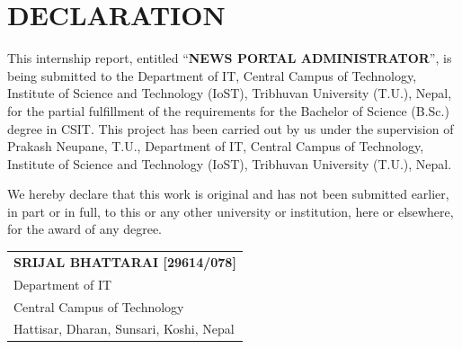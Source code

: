 \section*{\centering \Large \textbf{DECLARATION}}

\sloppy

This internship report, entitled ``{\bf NEWS PORTAL ADMINISTRATOR}'', is being submitted to the Department of IT, Central Campus of Technology, Institute of Science and Technology (IoST), Tribhuvan
University (T.U.), Nepal, for the partial fulfillment of the requirements for the Bachelor of Science (B.Sc.) degree in CSIT. This project has been carried out by us under the supervision of Prakash Neupane, T.U., Department of IT, Central Campus of Technology, Institute of Science and Technology (IoST), Tribhuvan University (T.U.), Nepal.

We hereby declare that this work is original and has not been submitted earlier, in part or in full, to this or any other university or institution, here or elsewhere, for the award of any degree.


\begin{flushleft}
\begin{tabular}{@{}l@{}}
    \textbf{SRIJAL BHATTARAI [29614/078]} \\
    Department of IT \\
    Central Campus of Technology \\
    Hattisar, Dharan, Sunsari, Koshi, Nepal \\
\end{tabular}
\end{flushleft}

\newpage